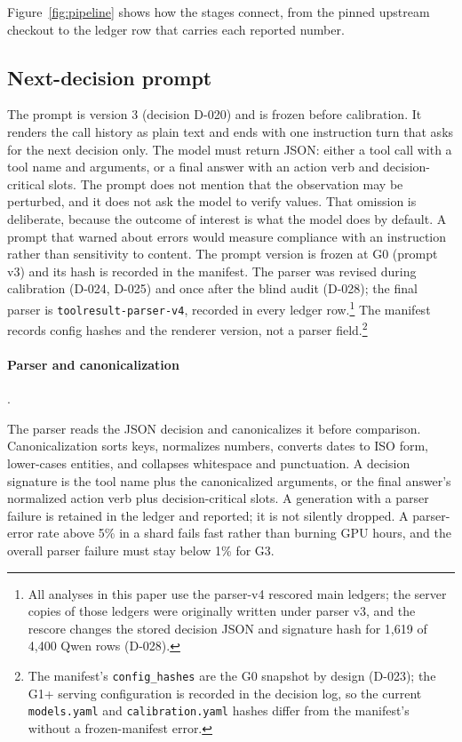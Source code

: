 \documentclass[a4paper,fleqn]{cas-sc}
\begin{document}
Figure~\ref{fig:pipeline} shows how the stages connect, from the pinned upstream checkout to the
ledger row that carries each reported number.

\subsection{Next-decision prompt}


The prompt is version 3 (decision D-020) and is frozen before calibration. It renders the call
history as plain text and ends with one instruction turn that asks for the next decision only. The model must
return JSON: either a tool call with a tool name and arguments, or a final answer with an action
verb and decision-critical slots. The prompt does not mention that the observation may be
perturbed, and it does not ask the model to verify values. That omission is deliberate, because
the outcome of interest is what the model does by default. A prompt that warned about errors
would measure compliance with an instruction rather than sensitivity to content. The prompt
version is frozen at G0 (prompt v3) and its hash is recorded in the manifest. The parser was
revised during calibration (D-024, D-025) and once after the blind audit (D-028); the final
parser is \texttt{toolresult-parser-v4}, recorded in every ledger row.\footnote{All analyses in
this paper use the parser-v4 rescored main ledgers; the server copies of those ledgers were
originally written under parser v3, and the rescore changes the stored decision JSON and
signature hash for 1{,}619 of 4{,}400 Qwen rows (D-028).} The manifest records
config hashes and the renderer version, not a parser field.\footnote{The manifest's
\texttt{config\_hashes} are the G0 snapshot by design (D-023); the G1+ serving configuration is
recorded in the decision log, so the current \texttt{models.yaml} and \texttt{calibration.yaml}
hashes differ from the manifest's without a frozen-manifest error.}

\paragraph{Parser and canonicalization}.\

The parser reads the JSON decision and canonicalizes it before comparison. Canonicalization sorts
keys, normalizes numbers, converts dates to ISO form, lower-cases entities, and collapses
whitespace and punctuation. A decision signature is the tool name plus the canonicalized
arguments, or the final answer's normalized action verb plus decision-critical slots. A
generation with a parser failure is retained in the ledger and reported; it is not silently
dropped. A parser-error rate above 5\% in a shard fails fast rather than burning GPU hours, and
the overall parser failure must stay below 1\% for G3.
\end{document}
